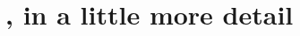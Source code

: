 \documentclass[10pt]{article}
\newcommand\lLine{{\color{lightgray} \noindent\rule{\textwidth}{0.4pt}}}
\begin{document}
\vfill

\begin{comment}
  In summary, constraint on answers to \qWhy{} in terms of answers to \qHow{} does not hold.

  In short, answering \emph{how} details a particular event.

  Yet, when asking about \emph{why} some thing we're often interested in classifying a particular event as an instance of a general phenomenon.

  \emph{Why} was the agent's reasoning an instance of applying their understanding of Sudoku, rather than something else?
  E.g., guessing randomly.

  To do this, one ends up citing the way things happen in other cases.

  In very short, a single instance of reasoning is an instance of a general type of reasoning \emph{only if} the particular instance may be adapted to a different instance of the type, resources permitting.

  So, that a particular \fofr{} answers \qWhy{} (sometimes) also entails various other \fofr{1} answer \qWhy{}.

  \lLine{}
\end{comment}

\begin{comment}
  Perhaps this result is due to the level of generality at which \qWhy{} and \qHow{} are asked?

  I don't think this is right.

  For example, suppose we have very detailed picture of what happens when someone is doing a Sudoku puzzle.
  And, there's some neural activity which is only activated when the agent is doing Sudoku puzzles.
  Sure, we have plausibly have an answer to both \qWhy{} which at first glance only looks at what happened (in line with \issueInclusion{}).
  However, what makes it the case that the neural activity is that of solving Sudoku puzzles?
  Well, plausibly due to the same neural activity in other events.
\end{comment}

\newpage

\section{\progEx{}, in a little more detail}
\end{document}
